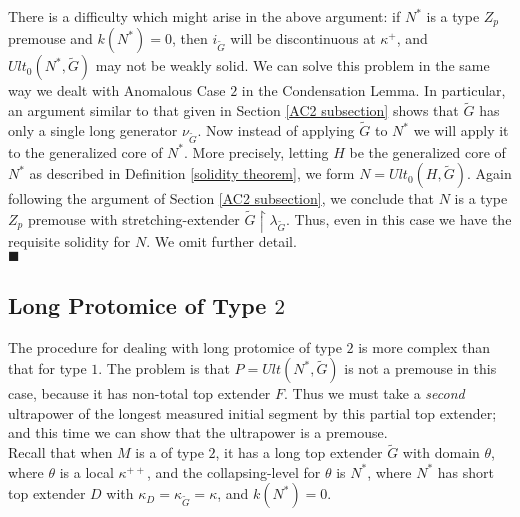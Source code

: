 \documentclass[12pt]{article}
\begin{document}
There is a difficulty which might arise in the above argument: if $N^*$ is a type $Z_p$ premouse and $k(N^*) = 0$, then $i_{\tilde{G}}$ will be discontinuous at $\kappa^+$, and $Ult_0 (N^* , \tilde{G})$ may not be weakly solid.  We can solve this problem in the same way we dealt with Anomalous Case $2$ in the Condensation Lemma.  In particular, an argument similar to that given in Section \ref{AC2 subsection} shows that $\tilde{G}$ has only a single long generator $\nu_{\tilde{G}}$.  Now instead of applying $\tilde{G}$ to $N^*$ we will apply it to the generalized core of $N^*$.  More precisely, letting $H$ be the generalized core of $N^*$ as described in Definition \ref{solidity theorem}, we form $N = Ult_0 ( H, \tilde{G})$.  Again following the argument of Section \ref{AC2 subsection}, we conclude that $N$ is a type $Z_p$ premouse with stretching-extender $\tilde{G} \restriction \lambda_{\tilde{G}}$.  Thus, even in this case we have the requisite solidity for $N$.  We omit further detail.\\



$\blacksquare$\\ 









\subsection{Long Protomice of Type $2$}








The procedure for dealing with long protomice of type $2$ is more complex than that for type $1$.  The problem is that $P = Ult(N^* , \tilde{G})$ is not a premouse in this case, because it has non-total top extender $F$.  Thus we must take a \textit{second} ultrapower of the longest measured initial segment by this partial top extender; and this time we can show that the ultrapower is a premouse.\\

Recall that when $M$ is a 
 of type $2$, it has a long top extender $\tilde{G}$ with domain $\theta$, where $\theta$ is a local $\kappa^{++}$, and the collapsing-level for $\theta$ is $N^*$, where $N^*$ has short top extender $D$ with $\kappa_D = \kappa_{\tilde{G}} = \kappa$, and $k(N^*) = 0$.\\
\end{document}
